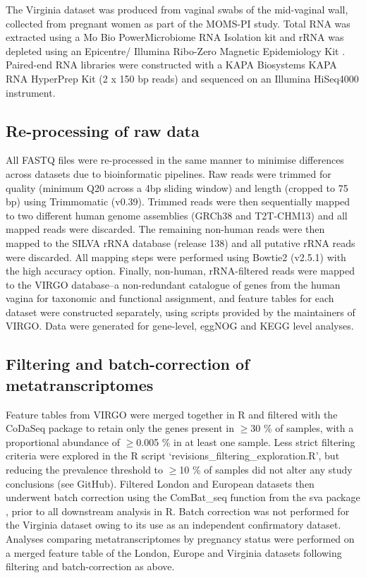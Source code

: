 \documentclass[sn-mathphys,Numbered]{sn-jnl}%
\begin{document}
The Virginia dataset was produced from vaginal swabs of the mid-vaginal wall, collected from pregnant women as part of the MOMS-PI study. Total RNA was extracted using a Mo Bio PowerMicrobiome RNA Isolation kit and rRNA was depleted using an Epicentre/ Illumina Ribo-Zero Magnetic Epidemiology Kit \citep{Fettweis:2019aa}. Paired-end RNA libraries were constructed with a KAPA Biosystems KAPA RNA HyperPrep Kit (2 x 150 bp reads) and sequenced on an Illumina HiSeq4000 instrument.

\subsection{Re-processing of raw data}\label{subsec:subsecReprocessing}
All FASTQ files were re-processed in the same manner to minimise differences across datasets due to bioinformatic pipelines. Raw reads were trimmed for quality (minimum Q20 across a 4bp sliding window) and length (cropped to 75 bp) using Trimmomatic (v0.39). Trimmed reads were then sequentially mapped to two different human genome assemblies (GRCh38 and T2T-CHM13) and all mapped reads were discarded. The remaining non-human reads were then mapped to the SILVA rRNA database (release 138) and all putative rRNA reads were discarded. All mapping steps were performed using Bowtie2 (v2.5.1) with the high accuracy option. Finally, non-human, rRNA-filtered reads were mapped to the VIRGO database--a non-redundant catalogue of genes from the human vagina \cite{Ma:2020aa} for taxonomic and functional assignment, and feature tables for each dataset were constructed separately, using scripts provided by the maintainers of VIRGO. Data were generated for gene-level, eggNOG \cite{Huerta-Cepas:2019uf} and KEGG \cite{Kanehisa:2010} level analyses. 

\subsection{Filtering and batch-correction of metatranscriptomes}\label{subsec:subsecAnalysis}
Feature tables from VIRGO were merged together in R and filtered with the CoDaSeq package to retain only the genes present in $\geq$30 \% of samples, with a proportional abundance of $\geq$0.005 \% in at least one sample. Less strict filtering criteria were explored in the R script `revisions\_filtering\_exploration.R', but reducing the prevalence threshold to $\geq$10 \% of samples did not alter any study conclusions (see GitHub). Filtered London and European datasets then underwent batch correction using the ComBat\_seq function from the sva package \cite{Zhang:2020ab}, prior to all downstream analysis in R. Batch correction was not performed for the Virginia dataset owing to its use as an independent confirmatory dataset. Analyses comparing metatranscriptomes by pregnancy status were performed on a merged feature table of the London, Europe and Virginia datasets following filtering and batch-correction as above.
\end{document}
